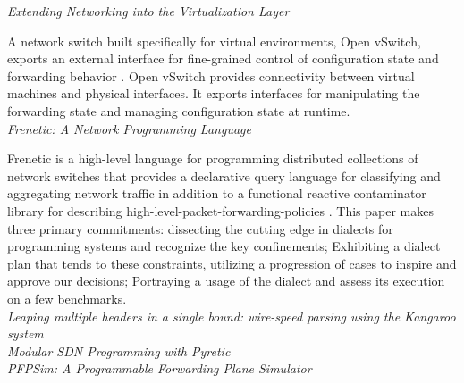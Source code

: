 \noindent \emph{Extending Networking into the Virtualization Layer}

A network switch built specifically for virtual environments, Open vSwitch,
exports an external interface
for fine-grained control of configuration state and forwarding behavior \cite{Pfaff2009}.
Open vSwitch provides
connectivity between virtual machines and physical interfaces. It exports
interfaces for manipulating
the forwarding state and managing configuration state at runtime. 
\\

\noindent \emph{Frenetic: A Network Programming Language} 

Frenetic is a high-level language for programming distributed collections of network
switches that provides a declarative query language for classifying and aggregating
network traffic in addition to a functional reactive contaminator library for describing
high-level-packet-forwarding-policies \cite{Foster:2011:FNP:2034773.2034812}.
This paper makes three primary commitments: dissecting the cutting edge in dialects for
programming systems and recognize the key confinements; Exhibiting a dialect plan that
tends to these constraints, utilizing a progression of cases to inspire and approve our
decisions; Portraying a usage of the dialect and assess its execution on a few benchmarks.
\\

\noindent \emph{Leaping multiple headers in a single bound: wire-speed parsing using the
	Kangaroo system}
\cite{Kozanitis:2010:LMH:1833515.1833654}\\


\noindent \emph{Modular SDN Programming with Pyretic}
\cite{Reich_modularsdn} \\

\noindent \emph{PFPSim: A Programmable Forwarding Plane Simulator} 

\cite{Abdi:2016:PPF:2881025.2881029}\\








